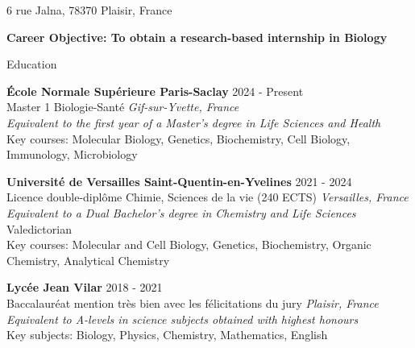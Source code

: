 \documentclass[
	10pt,
]{style} %
\begin{document}
\vspace{-0.25em}

\begin{center}
	6 rue Jalna, 78370 Plaisir, France \\
\end{center}

\begin{center}
	\textbf{Career Objective: To obtain a research-based internship in Biology}
\end{center}


\begin{rSection}{Education}

	\textbf{École Normale Supérieure Paris-Saclay} \hfill 2024 - Present \\
	Master 1 Biologie-Santé \hfill \textit{Gif-sur-Yvette, France} \\
	\textit{Equivalent to the first year of a Master's degree in Life Sciences and Health} \\
	Key courses: Molecular Biology, Genetics, Biochemistry, Cell Biology, Immunology, Microbiology

	\vspace{0.5mm}

	\textbf{Université de Versailles Saint-Quentin-en-Yvelines} \hfill 2021 - 2024 \\
	Licence double-diplôme Chimie, Sciences de la vie (240 ECTS) \hfill \textit{Versailles, France} \\
	\textit{Equivalent to a Dual Bachelor's degree in Chemistry and Life Sciences} \\
	Valedictorian \\
	Key courses: Molecular and Cell Biology, Genetics, Biochemistry, Organic Chemistry, Analytical Chemistry

	\vspace{0.5mm}

	\textbf{Lycée Jean Vilar} \hfill 2018 - 2021 \\
	Baccalauréat mention très bien avec les félicitations du jury \hfill \textit{Plaisir, France} \\
	\textit{Equivalent to A-levels in science subjects obtained with highest honours} \\
	Key subjects: Biology, Physics, Chemistry, Mathematics, English

\end{rSection}
\end{document}
